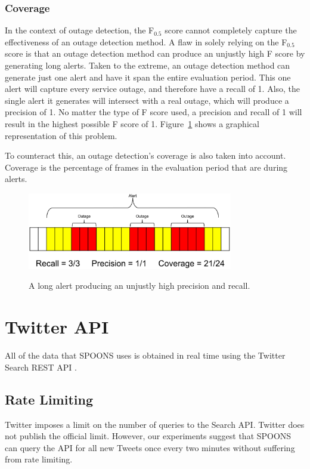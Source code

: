 \documentclass[12pt]{ucthesis}
\newcommand{\captionfonts}{\small\bf\ssp}
\begin{document}
\subsection{Coverage}
\label{background-accuracy-coverage}
In the context of outage detection, the F$_{0.5}$ score cannot completely capture the effectiveness of an outage detection method.
A flaw in solely relying on the F$_{0.5}$ score is that an outage detection method can produce an unjustly high F score by generating long alerts.
Taken to the extreme, an outage detection method can generate just one alert and have it span the entire evaluation period.
This one alert will capture every service outage, and therefore have a recall of 1.
Also, the single alert it generates will intersect with a real outage, which will produce a precision of 1.
No matter the type of F score used, a precision and recall of 1 will result in the highest possible F score of 1.
Figure~\ref{fig:coverage} shows a graphical representation of this problem.

To counteract this, an outage detection's coverage is also taken into account.
Coverage is the percentage of frames in the evaluation period that are during alerts.

\begin{figure}[H]
   \begin{center}
      \includegraphics[width=0.8\textwidth]{images/Coverage.eps}
      \captionfonts
      \caption[Coverage Example]{A long alert producing an unjustly high precision and recall.}
      \label{fig:coverage}
   \end{center}
\end{figure}

\chapter{Twitter API}
\label{api}
All of the data that SPOONS uses is obtained in real time using the Twitter Search REST API \cite{TwitterAPI}.

\section{Rate Limiting}
\label{api-rate-limit}
Twitter imposes a limit on the number of queries to the Search API. Twitter does not publish the official
limit. However, our experiments suggest that SPOONS can query the API for all new Tweets once every two minutes without
suffering from rate limiting.
\end{document}
